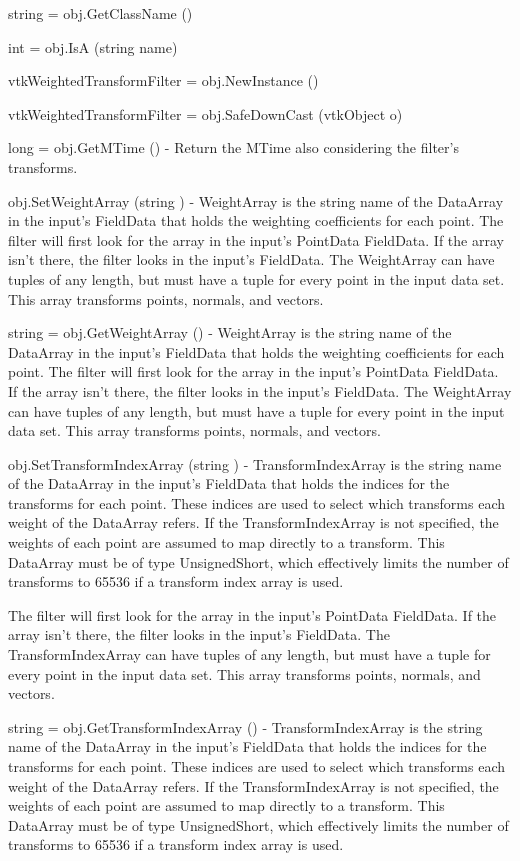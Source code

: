\begin{DoxyItemize}
\item {\ttfamily string = obj.\-Get\-Class\-Name ()}  
\item {\ttfamily int = obj.\-Is\-A (string name)}  
\item {\ttfamily vtk\-Weighted\-Transform\-Filter = obj.\-New\-Instance ()}  
\item {\ttfamily vtk\-Weighted\-Transform\-Filter = obj.\-Safe\-Down\-Cast (vtk\-Object o)}  
\item {\ttfamily long = obj.\-Get\-M\-Time ()} -\/ Return the M\-Time also considering the filter's transforms.  
\item {\ttfamily obj.\-Set\-Weight\-Array (string )} -\/ Weight\-Array is the string name of the Data\-Array in the input's Field\-Data that holds the weighting coefficients for each point. The filter will first look for the array in the input's Point\-Data Field\-Data. If the array isn't there, the filter looks in the input's Field\-Data. The Weight\-Array can have tuples of any length, but must have a tuple for every point in the input data set. This array transforms points, normals, and vectors.  
\item {\ttfamily string = obj.\-Get\-Weight\-Array ()} -\/ Weight\-Array is the string name of the Data\-Array in the input's Field\-Data that holds the weighting coefficients for each point. The filter will first look for the array in the input's Point\-Data Field\-Data. If the array isn't there, the filter looks in the input's Field\-Data. The Weight\-Array can have tuples of any length, but must have a tuple for every point in the input data set. This array transforms points, normals, and vectors.  
\item {\ttfamily obj.\-Set\-Transform\-Index\-Array (string )} -\/ Transform\-Index\-Array is the string name of the Data\-Array in the input's Field\-Data that holds the indices for the transforms for each point. These indices are used to select which transforms each weight of the Data\-Array refers. If the Transform\-Index\-Array is not specified, the weights of each point are assumed to map directly to a transform. This Data\-Array must be of type Unsigned\-Short, which effectively limits the number of transforms to 65536 if a transform index array is used.

The filter will first look for the array in the input's Point\-Data Field\-Data. If the array isn't there, the filter looks in the input's Field\-Data. The Transform\-Index\-Array can have tuples of any length, but must have a tuple for every point in the input data set. This array transforms points, normals, and vectors.  
\item {\ttfamily string = obj.\-Get\-Transform\-Index\-Array ()} -\/ Transform\-Index\-Array is the string name of the Data\-Array in the input's Field\-Data that holds the indices for the transforms for each point. These indices are used to select which transforms each weight of the Data\-Array refers. If the Transform\-Index\-Array is not specified, the weights of each point are assumed to map directly to a transform. This Data\-Array must be of type Unsigned\-Short, which effectively limits the number of transforms to 65536 if a transform index array is used.


\end{DoxyItemize}
